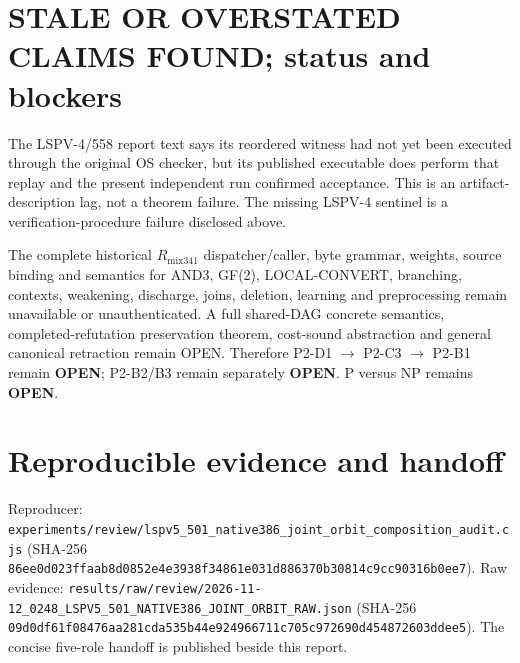 \documentclass[11pt]{article}
\begin{document}
\section*{STALE OR OVERSTATED CLAIMS FOUND; status and blockers}
The LSPV-4/558 report text says its reordered witness had not yet been executed
through the original OS checker, but its published executable does perform that
replay and the present independent run confirmed acceptance.  This is an
artifact-description lag, not a theorem failure.  The missing LSPV-4 sentinel
is a verification-procedure failure disclosed above.

The complete historical $R_{\mathrm{mix341}}$ dispatcher/caller, byte grammar,
weights, source binding and semantics for AND3, GF(2), LOCAL-CONVERT,
branching, contexts, weakening, discharge, joins, deletion, learning and
preprocessing remain unavailable or unauthenticated.  A full shared-DAG
concrete semantics, completed-refutation preservation theorem, cost-sound
abstraction and general canonical retraction remain OPEN.  Therefore
P2-D1 $\to$ P2-C3 $\to$ P2-B1 remain \textbf{OPEN}; P2-B2/B3 remain separately
\textbf{OPEN}.  P versus NP remains \textbf{OPEN}.

\section*{Reproducible evidence and handoff}
Reproducer:
\texttt{experiments/review/lspv5\_501\_native386\_joint\_orbit\_composition\_audit.cjs}
(SHA-256 \texttt{86ee0d023ffaab8d0852e4e3938f34861e031d886370b30814c9cc90316b0ee7}).
Raw evidence:
\texttt{results/raw/review/2026-11-12\_0248\_LSPV5\_501\_NATIVE386\_JOINT\_ORBIT\_RAW.json}
(SHA-256 \texttt{09d0df61f08476aa281cda535b44e924966711c705c972690d454872603ddee5}).
The concise five-role handoff is published beside this report.

\end{document}
